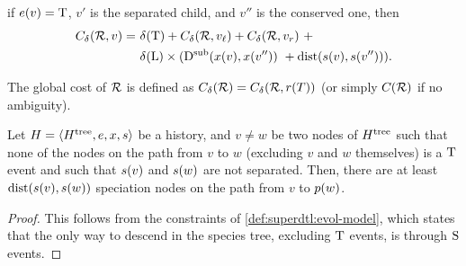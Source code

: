 \begin{definition}
\begin{compactitemize}
    \item if \(e(v) = \mathrm{T}\), \(v'\) is the separated child, and \(v''\) is the conserved one, then
        \begin{align*}
            C_{\delta\kern.1pt}(\mathcal{R}, v) =\ &
            \delta\kern.1pt(\mathrm{T}) + C_{\delta\kern.1pt}(\mathcal{R}, v_\mathit{\ell}) + C_{\delta\kern.1pt}(\mathcal{R}, v_r)\ +\\
            & \delta\kern.1pt(\mathrm{L}) \times (
                \mathrm{D}^\mathrm{sub}(x(v), x(v''))\ +
                \mathrm{dist}(s(v), s(v''))).
        \end{align*}
    \end{compactitemize}
    The global cost of \(\mathcal{R}\) is defined as \(C_{\delta\kern.1pt}(\mathcal{R}) = C_{\delta\kern.1pt}(\mathcal{R}, r(T))\) (or simply \(C_{}(\mathcal{R})\) if no ambiguity).
\end{definition}

\begin{lemma}\label{lem:superdtl:history-min-spe}
    Let \(H = \left\langle H^\mathrm{tree}, e, x, s\right\rangle\) be a history, and \(v \neq w\) be two nodes of \(H^\mathrm{tree}\) such that none of the nodes on the path from \(v\) to \(w\) (excluding \(v\) and \(w\) themselves) is a \(\mathrm{T}\) event and such that \(s(v)\) and \(s(w)\) are not separated. Then, there are at least \(\mathrm{dist}(s(v), s(w))\) speciation nodes on the path from \(v\) to \(p(w)\).
\end{lemma}
\begin{proof}
    This follows from the constraints of \cref{def:superdtl:evol-model}, which states that the only way to descend in the species tree, excluding \(\mathrm{T}\) events, is through \(\mathrm{S}\) events.
\end{proof}

